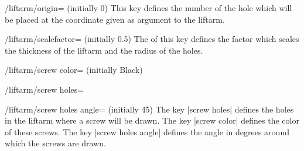 \documentclass[a4paper,english,dvipsnames]{ltxdoc}
\begin{document}
\begin{command}{\liftarm{}}
\begin{key}{/liftarm/origin= (initially 0)}
This key defines the number of the hole which will be placed at the coordinate given as argument to the liftarm.
\begin{codeexample}[width=10cm]
\end{codeexample}
\end{key}
\begin{key}{/liftarm/scalefactor= (initially 0.5)}
The  of this key defines the factor which scales the thickness of the liftarm and the radius of the holes.
\begin{codeexample}[width=10cm]
\end{codeexample}
\end{key}
\begin{key}{/liftarm/screw color= (initially Black)}
\end{key}
\begin{key}{/liftarm/screw holes=}
\end{key}
\begin{key}{/liftarm/screw holes angle= (initially 45)}
The key |screw holes| defines the holes in the liftarm where a screw will be drawn. The key |screw color| defines the color of these screws. The key |screw holes angle| defines the angle in degrees around which the screws are drawn.
\begin{codeexample}[width=10cm]
\end{codeexample}
\end{key}
\end{command}
\end{document}
